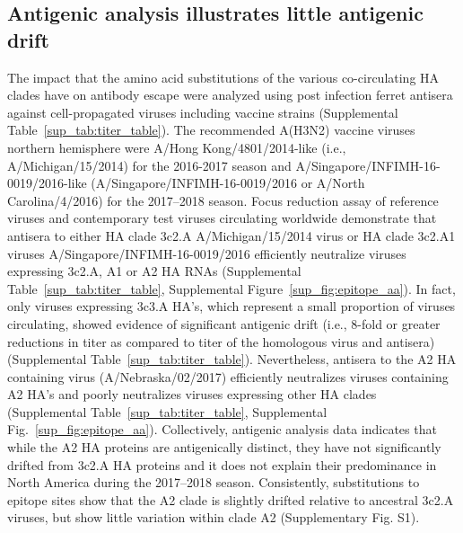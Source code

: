 \subsection*{Antigenic analysis illustrates little antigenic drift}
The impact that the amino acid substitutions of the various co-circulating HA clades have on antibody escape were analyzed using post infection ferret antisera against cell-propagated viruses including vaccine strains (Supplemental Table~\ref{sup_tab:titer_table}).
The recommended A(H3N2) vaccine viruses northern hemisphere were A/Hong Kong/4801/2014-like (i.e., A/Michigan/15/2014) for the 2016-2017 season and A/Singapore/INFIMH-16-0019/2016-like (A/Singapore/INFIMH-16-0019/2016 or A/North Carolina/4/2016) for the 2017--2018 season.
Focus reduction assay of reference viruses and contemporary test viruses circulating worldwide demonstrate that antisera to either HA clade 3c2.A A/Michigan/15/2014 virus or HA clade 3c2.A1 viruses A/Singapore/INFIMH-16-0019/2016 efficiently neutralize viruses expressing 3c2.A, A1 or A2 HA RNAs (Supplemental Table~\ref{sup_tab:titer_table}, Supplemental Figure~\ref{sup_fig:epitope_aa}).
In fact, only viruses expressing 3c3.A HA’s, which represent a small proportion of viruses circulating, showed evidence of significant antigenic drift (i.e., 8-fold or greater reductions in titer as compared to titer of the homologous virus and antisera) (Supplemental Table~\ref{sup_tab:titer_table}).
Nevertheless, antisera to the A2 HA containing virus (A/Nebraska/02/2017) efficiently neutralizes viruses containing A2 HA’s and poorly neutralizes viruses expressing other HA clades (Supplemental Table~\ref{sup_tab:titer_table}, Supplemental Fig.~\ref{sup_fig:epitope_aa}).
Collectively, antigenic analysis data indicates that while the A2 HA proteins are antigenically distinct, they have not significantly drifted from 3c2.A HA proteins and it does not explain their predominance in North America during the 2017--2018 season.
Consistently, substitutions to epitope sites show that the A2 clade is slightly drifted relative to ancestral 3c2.A viruses, but show little variation within clade A2 (Supplementary Fig. S1).

